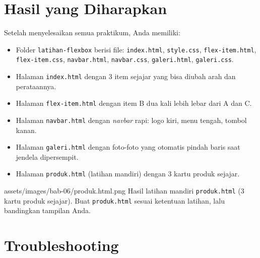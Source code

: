 \section{Hasil yang Diharapkan}
\label{sec:flex-hasil}

Setelah menyelesaikan semua praktikum, Anda memiliki:
\begin{itemize}
  \item Folder \texttt{latihan-flexbox} berisi file: \texttt{index.html}, \texttt{style.css}, \texttt{flex-item.html}, \texttt{flex-item.css}, \texttt{navbar.html}, \texttt{navbar.css}, \texttt{galeri.html}, \texttt{galeri.css}.
  \item Halaman \texttt{index.html} dengan 3 item sejajar yang bisa diubah arah dan perataannya.
  \item Halaman \texttt{flex-item.html} dengan item B dua kali lebih lebar dari A dan C.
  \item Halaman \texttt{navbar.html} dengan \emph{navbar} rapi: logo kiri, menu tengah, tombol kanan.
  \item Halaman \texttt{galeri.html} dengan foto-foto yang otomatis pindah baris saat jendela dipersempit.
  \item Halaman \texttt{produk.html} (latihan mandiri) dengan 3 kartu produk sejajar.
\end{itemize}

\begin{tangkapanlayar}
  {assets/images/bab-06/produk.html.png}
  {Hasil latihan mandiri \texttt{produk.html} (3 kartu produk sejajar).}
  {Buat \texttt{produk.html} sesuai ketentuan latihan, lalu bandingkan tampilan Anda.}
\end{tangkapanlayar}

\section{Troubleshooting}
\label{sec:flex-trouble}


